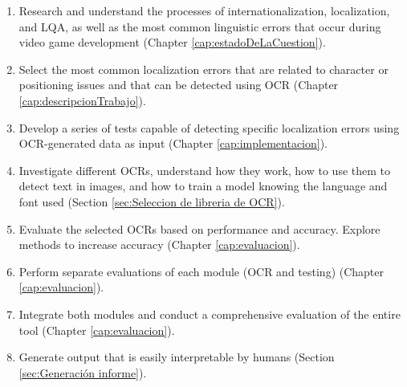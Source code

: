 \begin{enumerate}
	\item Research and understand the processes of internationalization, localization, and LQA, as well as the most common linguistic errors that occur during video game development (Chapter \ref{cap:estadoDeLaCuestion}).
	\item Select the most common localization errors that are related to character or positioning issues and that can be detected using OCR (Chapter \ref{cap:descripcionTrabajo}).
	\item Develop a series of tests capable of detecting specific localization errors using OCR-generated data as input (Chapter \ref{cap:implementacion}).
	\item Investigate different OCRs, understand how they work, how to use them to detect text in images, and how to train a model knowing the language and font used (Section \ref{sec:Seleccion de libreria de OCR}).
	\item Evaluate the selected OCRs based on performance and accuracy. Explore methods to increase accuracy (Chapter \ref{cap:evaluacion}).
	\item Perform separate evaluations of each module (OCR and testing) (Chapter \ref{cap:evaluacion}).
	\item Integrate both modules and conduct a comprehensive evaluation of the entire tool (Chapter \ref{cap:evaluacion}).
	\item Generate output that is easily interpretable by humans (Section \ref{sec:Generación informe}).
\end{enumerate}








